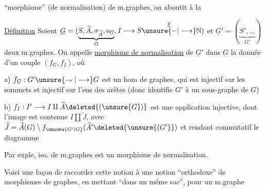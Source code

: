 ``morphisme'' (de normalisation) de m.graphes, on aboutit à la

\uline{Définition} Soient $\underline G=(\underbrace{S,\widetilde A,\sigma_{\widetilde A},o_G}_{G},I\longrightarrow S\overset{\underline g}{\unsure{-|\longrightarrow}}\mathbb N)$ et $\underline G'=(\underbrace{S',\ldots}_{G'})$ deux m.graphes. On appelle \uline{morphisme de normalisation} de $\underline G'$ dans $\underline G$ la donnée d'un couple  $(f_G,f_I)$, où

a) $f_G:G'\unsure{\rightharpoondown|\longrightarrow}G$ est un hom de graphes, qui est injectif sur les sommets et injectif sur l'ens des arêtes (donc identifie $G'$ à un sous-graphe de $G$)


b) $f_I:I'\longrightarrow I\amalg\widetilde A\deleted{(\unsure{G})}$ est une application injective, dont l'image est contenue $I\amalg\widetilde J$, avec $\widetilde J=\widetilde A(G)\setminus f_{\unsure{G'|G}}(\widetilde A'\deleted{\unsure{(G'}})$ et rendant commutatif le diagramme

Par exple, iso. de m.graphes est un morphisme de normalisation. 

Voici une façon de raccorder cette notion à une notion ``orthodoxe'' de morphismes de graphes, en mettant ``dans un même sac'', pour un m.graphe

